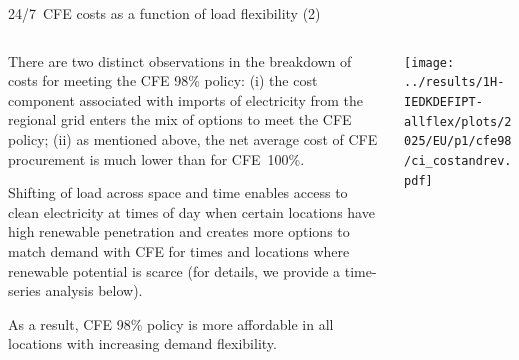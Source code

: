 \begin{frame}{24/7~CFE costs as a function of load flexibility (2)}
  \label{cfe98cost}

  {\footnotesize
  \vspace{0.2cm}
  
  \begin{columns}[T]

  \begin{column}{6cm}
  There are two distinct observations in the breakdown of costs for meeting the CFE 98\% policy: (i) the cost component associated with imports of electricity from the regional grid enters the mix of options to meet the CFE policy; (ii) as mentioned above, the net average cost of CFE procurement is much lower than for CFE~100\%.

  \vspace{0.1cm}
  Shifting of load across space and time \alert{enables access to clean electricity} at times of day when certain locations have high renewable penetration and \alert{creates more options to match demand with CFE} for times and locations where renewable potential is scarce (for details, we provide a time-series analysis below). 

  \vspace{0.1cm}
  As a result, CFE 98\% policy is more affordable in all locations with increasing demand flexibility. 

  \end{column}

  \begin{column}{9cm}
    \centering
    \texttt{[image: ../results/1H-IEDKDEFIPT-allflex/plots/2025/EU/p1/cfe98/ci\_costandrev.pdf]}
  \end{column}

  \end{columns}
  }
\end{frame}



